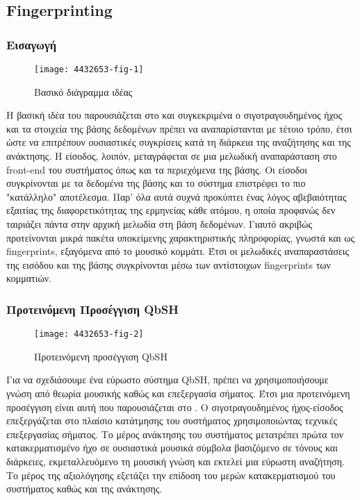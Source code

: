 \newcommand*{\fp}{Fingerprinting}%
\newcommand*{\fps}{fingerprints}%
\subsection{\fp{}}\label{sub:fingerprinting}

\subsubsection{Εισαγωγή}
\begin{wrapfigure}{r}{0.5\textwidth}
        \centering
        \vspace{-20pt}\texttt{[image: 4432653-fig-1]}
        \vspace{-20pt}\caption{Βασικό διάγραμμα ιδέας}
        \label{fig:4432653-fig-1}
\end{wrapfigure}
Η βασική ιδέα του \cite{fingerapproach2008} παρουσιάζεται στο 
και συγκεκριμένα ο σιγοτραγουδημένος ήχος και τα στοιχεία της βάσης δεδομένων
πρέπει να αναπαρίστανται με τέτοιο τρόπο, έτσι ώστε να επιτρέπουν ουσιαστικές
συγκρίσεις κατά τη διάρκεια της αναζήτησης και της ανάκτησης. Η είσοδος, λοιπόν,
μεταγράφεται σε μια μελωδική αναπαράσταση στο front-end του συστήματος όπως και
τα περιεχόμενα της βάσης. Οι είσοδοι συγκρίνονται με τα δεδομένα της βάσης και
το σύστημα επιστρέφει το πιο "κατάλληλο" αποτέλεσμα. Παρ' όλα αυτά συχνά
προκύπτει ένας λόγος αβεβαιότητας εξαιτίας της διαφορετικότητας της ερμηνείας
κάθε ατόμου, η οποία προφανώς δεν ταιριάζει πάντα στην αρχική μελωδία στη βάση
δεδομένων. Γιαυτό ακριβώς προτείνονται μικρά πακέτα υποκείμενης χαρακτηριστικής
πληροφορίας, γνωστά και ως \fps{}, εξαγόμενα από το μουσικό κομμάτι. Έτσι οι
μελωδικές αναπαραστάσεις της εισόδου και της βάσης συγκρίνονται μέσω των
αντίστοιχων \fps{} των κομματιών.

\subsubsection{Προτεινόμενη Προσέγγιση QbSH}
\begin{wrapfigure}{r}{0.5\textwidth}
        \centering
        \vspace{-20pt}\texttt{[image: 4432653-fig-2]}
        \vspace{-20pt}\caption{Προτεινόμενη προσέγγιση QbSH}
        \label{fig:4432653-fig-2}
\end{wrapfigure}
Για να σχεδιάσουμε ένα εύρωστο σύστημα QbSH, πρέπει να χρησιμοποιήσουμε γνώση
από θεωρία μουσικής καθώς και επεξεργασία σήματος. Έτσι μια προτεινόμενη
προσέγγιση είναι αυτή που παρουσιάζεται στο . Ο
σιγοτραγουδημένος ήχος-είσοδος επεξεργάζεται στο πλαίσιο κατάτμησης του
συστήματος χρησιμοποιώντας τεχνικές επεξεργασίας σήματος. Το μέρος ανάκτησης
του συστήματος μετατρέπει πρώτα τον κατακερματισμένο ήχο σε ουσιαστικά μουσικά
σύμβολα βασιζόμενο σε τόνους και διάρκειες, εκμεταλλευόμενο τη μουσική γνώση
και εκτελεί μια εύρωστη αναζήτηση. Το μέρος της αξιολόγησης εξετάζει την
επίδοση του μερών κατακερματισμού του συστήματος καθώς και της ανάκτησης.

